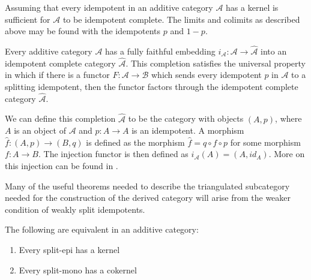     \begin{remark}
        Assuming that every idempotent in an additive category $\mathcal{A}$ has a kernel is sufficient for $\mathcal{A}$ to be idempotent complete. The limits and colimits as described above may be found with the idempotents $p$ and $1-p$.
    \end{remark}

    Every additive category $\mathcal{A}$ has a fully faithful embedding $i_{\mathcal{A}}:\mathcal{A}\rightarrow \widehat{\mathcal{A}}$ into an idempotent complete category $\widehat{\mathcal{A}}$. This completion satisfies the universal property in which if there is a functor $F:\mathcal{A}\rightarrow\mathcal{B}$ which sends every idempotent $p$ in $\mathcal{A}$ to a splitting idempotent, then the functor factors through the idempotent complete category $\widehat{\mathcal{A}}$.

    \begin{center}
    \end{center}

    We can define this completion $\widehat{\mathcal{A}}$ to be the category with objects $(A,p)$, where $A$ is an object of $\mathcal{A}$ and $p:A\rightarrow A$ is an idempotent. A morphism $\widehat{f}:(A,p)\rightarrow (B,q)$ is defined as the morphism $\widehat{f} = q \circ f \circ p$ for some morphism $f:A\rightarrow B$. The injection functor is then defined as $i_{\mathcal{A}}(A)=(A,id_A)$. More on this injection can be found in \cite{buhler}.
    
    Many of the useful theorems needed to describe the triangulated subcategory needed for the construction of the derived category will arise from the weaker condition of weakly split idempotents.

    \begin{lemma}
        The following are equivalent in an additive category:
        \begin{enumerate}
            \item Every split-epi has a kernel
            \item Every split-mono has a cokernel
        \end{enumerate}
    \end{lemma}

